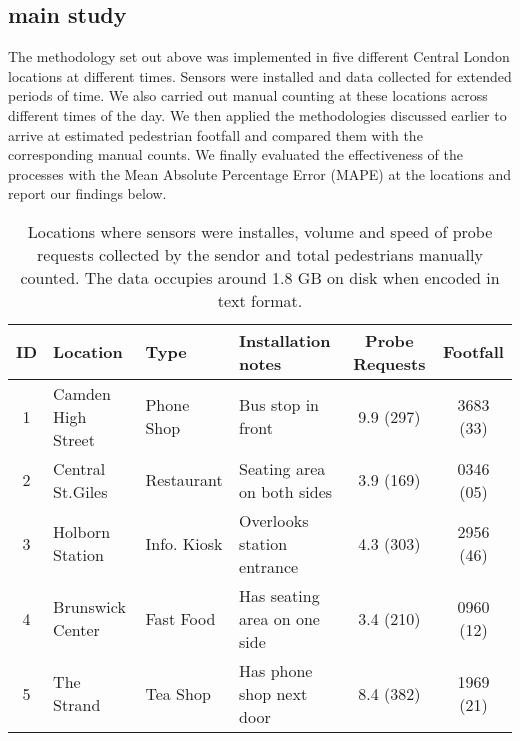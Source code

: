 \subsection{main study}

The methodology set out above was implemented in five different Central London locations at different times. Sensors were installed and data collected for extended periods of time. We also carried out manual counting at these locations across different times of the day. We then applied the methodologies discussed earlier to arrive at estimated pedestrian footfall and compared them with the corresponding manual counts.  We finally evaluated the effectiveness of the processes with the Mean Absolute Percentage Error (MAPE) at the locations and report our findings below.  

\begin{table}
    \caption{Locations where sensors were installes, volume and speed of probe requests collected by
    the sendor and total pedestrians manually counted. The data occupies around 1.8 GB on disk 
    when encoded in text format.}
    {\begin{tabular}{cp{2cm}p{1.5cm}p{2cm}cc} 
		\toprule
         ID & Location & Type & Installation notes & Probe Requests & Footfall\\
		 \midrule
         1 & Camden High Street & Phone Shop & Bus stop in front & 9.9 (297) & 3683 (33)\\
         2 & Central St.Giles & Restaurant & Seating area on both sides & 3.9 (169) & 0346 (05)\\
         3 & Holborn Station & Info. Kiosk & Overlooks station entrance & 4.3 (303) & 2956 (46)\\
         4 & Brunswick Center & Fast Food & Has seating area on one side & 3.4 (210) & 0960 (12)\\
         5 & The Strand & Tea Shop & Has phone shop next door & 8.4 (382) & 1969 (21)\\
		 \bottomrule
	\end{tabular}}
	\label{locations-table}
\end{table}


